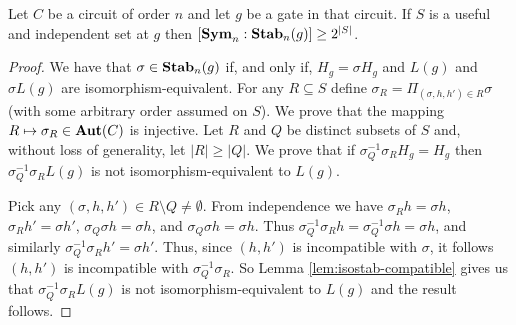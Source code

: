 \documentclass[../paper.tex]{subfiles}
\begin{document}
\begin{lem}
  \label{lem:useful-independant-set}
  Let $C$ be a circuit of order $n$ and let $g$ be a gate in that circuit. If
  $S$ is a useful and independent set at $g$ then $[\text{\textbf{Sym}}_n : \text{\textbf{Stab}}_n(g)] \geq
  2^{\vert S \vert}$.
\end{lem}
\begin{proof}
  We have that $\sigma \in \text{\textbf{Stab}}_n(g)$ if, and only if, $H_g = \sigma H_g$ and
  $L(g)$ and $\sigma L(g)$ are isomorphism-equivalent. For any $R \subseteq S$
  define $\sigma_R = \Pi_{(\sigma, h, h') \in R} \sigma$ (with some arbitrary
  order assumed on $S$). We prove that the mapping $R \mapsto \sigma_R
  \in\text{\textbf{Aut}}(C)$
  is injective. Let $R$ and $Q$ be distinct subsets of $S$ and, without loss
  of generality, let $\vert R \vert \geq \vert Q \vert$.
We prove that if $\sigma^{-1}_Q
  \sigma_R H_g = H_g$ then $\sigma^{-1}_Q \sigma_R L(g)$ is not
  isomorphism-equivalent to $L(g)$.

  Pick any $(\sigma, h, h') \in R \setminus Q \neq \emptyset$. From independence
  we have $\sigma_R h = \sigma h$, $\sigma_R h' = \sigma h'$, $\sigma_Q \sigma h
  = \sigma h $, and $\sigma_Q \sigma h = \sigma h$. Thus $\sigma^{-1}_Q \sigma_R
  h = \sigma^{-1}_Q \sigma h = \sigma h$, and similarly $\sigma^{-1}_Q\sigma_R
  h' = \sigma h'$. Thus, since $(h, h')$ is incompatible with $\sigma$, it
  follows $(h, h')$ is incompatible with $\sigma^{-1}_Q\sigma_R$. So Lemma
  \ref{lem:isostab-compatible} gives us that $\sigma^{-1}_Q \sigma_R L(g)$ is
  not isomorphism-equivalent to $L(g)$ and the result follows.
\end{proof}

%



\end{document}
